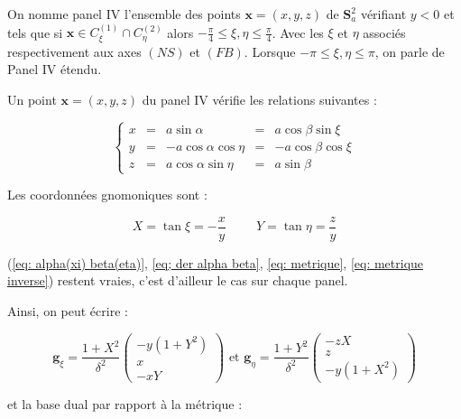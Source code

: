 \begin{definition}
On nomme panel IV l'ensemble des points $\mathbf{x}=(x,y,z)$ de $\mathbf{S}_a^2$ vérifiant $y<0$ et tels que si $\mathbf{x} \in C_{\xi}^{(1)} \cap C_{\eta}^{(2)}$ alors $-\frac{\pi}{4}\leq \xi,\eta \leq \frac{\pi}{4}$. Avec les $\xi$ et $\eta$ associés respectivement aux axes $(NS)$ et $(FB)$. Lorsque $-\pi \leq \xi,\eta \leq \pi$, on parle de Panel IV étendu.
\end{definition}

Un point $\mathbf{x}=(x,y,z)$ du panel IV vérifie les relations suivantes :

\begin{equation}
\left\lbrace
\begin{array}{rcccc}
x & = & a \sin \alpha & = & a \cos \beta \sin \xi \\
y & = & - a \cos \alpha \cos \eta & = & - a \cos \beta \cos \xi \\
z & = & a \cos \alpha \sin \eta & = & a \sin \beta
\end{array}
\right.
\end{equation}

Les coordonnées gnomoniques sont :

\begin{equation}
X = \tan \xi = - \dfrac{x}{y} \hspace{1cm} Y = \tan \eta = \dfrac{z}{y}
\end{equation}

(\ref{eq: alpha(xi) beta(eta)}, \ref{eq; der alpha beta}, \ref{eq: metrique}, \ref{eq: metrique inverse}) restent vraies, c'est d'ailleur le cas sur chaque panel. 

Ainsi, on peut écrire : 

\begin{equation}
\mathbf{g}_{\xi} = \dfrac{1+X^2}{\delta^2} \begin{pmatrix}
-y(1+Y^2) \\ x \\ -xY
\end{pmatrix} \text{ et } \mathbf{g}_{\eta} = \dfrac{1+Y^2}{\delta^2} \begin{pmatrix}
-zX \\ z \\ -y(1+X^2)
\end{pmatrix}
\label{eq: base locale IV}
\end{equation}

et la base dual par rapport à la métrique :

